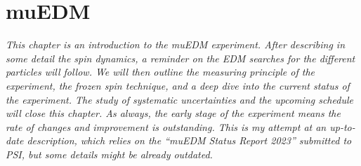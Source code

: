 \chapter{muEDM}
\label{ch:muEDM}
\begin{refsection}

{\itshape
This chapter is an introduction to the muEDM experiment. After describing in some detail the spin dynamics, a reminder on the EDM searches for the different particles will follow.
We will then outline the measuring principle of the experiment, the frozen spin technique, and a deep dive into the current status of the experiment. 
The study of systematic uncertainties and the upcoming schedule will close this chapter. 
As always, the early stage of the experiment means the rate of changes and improvement is outstanding. 
This is my attempt at an up-to-date description, which relies on the ``muEDM Status Report 2023'' submitted to PSI, but some details might be already outdated.}

\cite{muEDM:Semertzidis:2001} \cite{muEDM:Adelmann:2010} \cite{muEDM:J-PARC:2011} \cite{muEDM:J-PARC:2016} \cite{muEDM:PSI:2021} \cite{muEDM:PSI:Mikio:2022} \cite{muEDM:PSI:Kim:2022}
\cite{muEDM:Flavour:2008}\cite{muEDM:Ring:2004}


\end{refsection}
